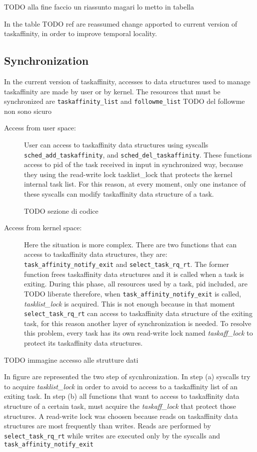 TODO alla fine faccio un riassunto magari lo metto in tabella

In the table TODO ref are reassumed change apported to current version of taskaffinity, in order to improve temporal locality.

\subsection{Synchronization}

In the current version of taskaffinity, accesses to data structures used to manage taskaffinity are made by user or by kernel. The resources that must be
synchronized are \texttt{taskaffinity\_list} and \texttt{followme\_list} TODO del followme non sono sicuro

\begin{description}
\item[Access from user space:] User can access to taskaffinity data structures using syscalls \texttt{sched\_add\_taskaffinity}, and 
\texttt{sched\_del\_taskaffinity}. These functions access to pid of the task received in input in synchronized way, because they using the read-write lock
tasklist\_lock that protects the kernel internal task list. For this reason, at every moment, only one instance of these syscalls can modify taskaffinity 
data structure of a task.

TODO sezione di codice

\item[Access from kernel space:] Here the situation is more complex. There are two functions that can access to taskaffinity data structures, they are:
\texttt{task\_affinity\_notify\_exit} and \texttt{select\_task\_rq\_rt}. The former function frees taskaffinity data structures and it is called when a 
task is exiting. During this phase, all resources used by a task, pid included, are TODO liberate therefore, when \texttt{task\_affinity\_notify\_exit} is 
called, \textit{tasklist\_lock} is acquired. This is not enough because in that moment \texttt{select\_task\_rq\_rt} can access to taskaffinity data 
structure of the exiting task, for this reason another layer of synchronization is needed. To resolve this problem, every task has its own read-write lock 
named \textit{taskaff\_lock} to protect its taskaffinity data structures. 

\end{description}

TODO immagine accesso alle strutture dati

In figure are represented the two step of sycnhronization. In step (a) syscalls try to acquire \textit{tasklist\_lock} in order to avoid to access to a 
taskaffinity list of an exiting task. In step (b) all functions that want to access to taskaffinity data structure of a certain task, must acquire the
\textit{taskaff\_lock} that protect those structures. A read-write lock was choosen because reads on taskaffinity data structures are most frequently than 
writes. Reads are performed by \texttt{select\_task\_rq\_rt} while writes are executed only by the syscalls and \texttt{task\_affinity\_notify\_exit}




